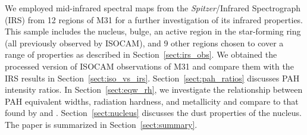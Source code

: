 We employed mid-infrared spectral maps from the {\em Spitzer}/Infrared Spectrograph (IRS) from 12 regions of M31 for a further investigation of 
its infrared properties. This sample includes the nucleus, bulge, an active region in the star-forming ring (all previously observed by ISOCAM), and 9 
other regions chosen to cover a range of properties as described in Section~\ref{sect:irs_obs}. 
We obtained the processed version of ISOCAM observations of M31 and compare them with the IRS results in Section~\ref{sect:iso_vs_irs}. 
Section~\ref{sect:pah_ratios} discusses PAH intensity ratios.
In Section~\ref{sect:eqw_rh}, we investigate the relationship between PAH equivalent widths, radiation 
hardness, and metallicity and compare to that found by \citet{Engelbracht_2008} and \citet{Gordon:2008lr}.  
Section~\ref{sect:nucleus} discusses the dust properties of the nucleus. The paper is summarized in Section~\ref{sect:summary}.
